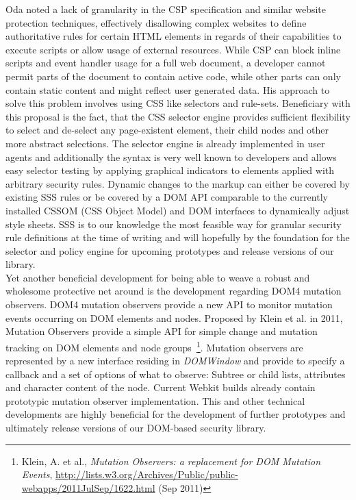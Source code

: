 Oda noted a lack of granularity in the CSP specification and similar website protection techniques, effectively disallowing complex websites to define authoritative rules for certain HTML elements in regards of their capabilities to execute scripts or allow usage of external resources. While CSP can block inline scripts and event handler usage for a full web document, a developer cannot permit parts of the document to contain active code, while other parts can only contain static content and might reflect user generated data. His approach to solve this problem involves using CSS like selectors and rule-sets. Beneficiary with this proposal is the fact, that the CSS selector engine provides sufficient flexibility to select and de-select any page-existent element, their child nodes and other more abstract selections. The selector engine is already implemented in user agents and additionally the syntax is very well known to developers and allows easy selector testing by applying graphical indicators to elements applied with arbitrary security rules. Dynamic changes to the markup can either be covered by existing SSS rules or be covered by a DOM API comparable to the currently installed CSSOM (CSS Object Model) and DOM interfaces to dynamically adjust style sheets. SSS is to our knowledge the most feasible way for granular security rule definitions at the time of writing and will hopefully by the foundation for the selector and policy engine for upcoming prototypes and release versions of our library.\\

Yet another beneficial development for being able to weave a robust and wholesome protective net around is the development regarding DOM4 mutation observers. DOM4 mutation observers provide a new API to monitor mutation events occurring on DOM elements and nodes. Proposed by Klein et al. in 2011, Mutation Observers provide a simple API for simple change and mutation tracking on DOM elements and node groups~\footnote{Klein, A. et al., \textit{Mutation Observers: a replacement for DOM Mutation Events}, \url{http://lists.w3.org/Archives/Public/public-webapps/2011JulSep/1622.html} (Sep 2011)}. Mutation observers are represented by a new interface residing in \textit{DOMWindow} and provide to specify a callback and a set of options of what to observe: Subtree or child lists, attributes and character content of the node. Current Webkit builds already contain prototypic mutation observer implementation. This and other technical developments are highly beneficial for the development of further prototypes and ultimately release versions of our DOM-based security library.\\

